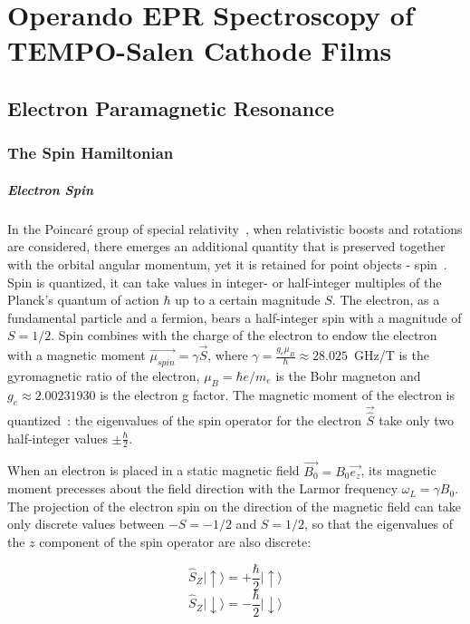 \chapter{Operando EPR Spectroscopy of TEMPO-Salen Cathode Films}
\section{Electron Paramagnetic Resonance}
\subsection{The Spin Hamiltonian}
\paragraph*{Electron Spin}
In the Poincaré group of special relativity~\cite{poincare_1905}, when relativistic boosts and rotations are considered, there emerges an additional quantity that is preserved together with the orbital angular momentum, yet it is retained for point objects - spin~\cite{kuprov_2023}. Spin is quantized, it can take values in integer- or half-integer multiples of the Planck's quantum of action $\hbar$ up to a certain magnitude $S$. The electron, as a fundamental particle and a fermion, bears a half-integer spin with a magnitude of $S=1/2$. Spin combines with the charge of the electron to endow the electron with a magnetic moment $\vec{\mu_{spin}} = \gamma\vec{S}$, where $\gamma=\frac{g_e\mu_B}{\hbar}\approx 28.025$~GHz/T is the gyromagnetic ratio of the electron, $\mu_B=\hbar e/m_e$ is the Bohr magneton and $g_e \approx 2.00231930$ is the electron g factor. The magnetic moment of the electron is quantized~\cite{SternGerlach1922}: the eigenvalues of the spin operator for the electron $\vec{\hat{S}}$ take only two half-integer values $\pm\frac{\hbar}{2}$. 
\par
When an electron is placed in a static magnetic field $\vec{B_0}=B_0 \vec{e_z}$, its magnetic moment precesses about the field direction with the Larmor frequency $\omega_L = \gamma B_0$. The projection of the electron spin on the direction of the magnetic field can take only discrete values between $-S=-1/2$ and $S=1/2$, so that the eigenvalues of the $z$ component of the spin operator are also discrete: 

\begin{equation}
\label{sz_states}
\hat{S}_Z\vert{\uparrow\rangle}=+\frac{\hbar}{2}\vert{\uparrow\rangle}
\end{equation}
\begin{equation*}
\hat{S}_Z\vert{\downarrow\rangle}=-\frac{\hbar}{2}\vert{\downarrow\rangle}
\end{equation*}

